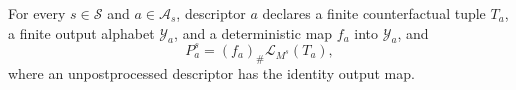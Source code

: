 For every \(s\in\mathcal S\) and \(a\in\mathcal A_s\), descriptor \(a\) declares a finite counterfactual tuple \(T_a\), a finite output alphabet \(\mathcal Y_a\), and a deterministic map \(f_a\) into \(\mathcal Y_a\), and
\[
P_a^s=(f_a)_\#\mathcal L_{M^s}(T_a),
\]
where an unpostprocessed descriptor has the identity output map.